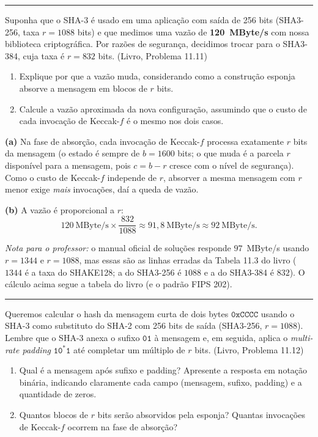 \documentclass[11pt,a4paper]{article}
\newcommand{\livro}[1]{{\footnotesize\color{black!50}(Livro, Problema #1)}}
\newcommand{\exercicio}[1]{%
    \Needspace{8\baselineskip}%
    \par\vspace{1.2em}
    \noindent
    {\color{black!55}\rule[-0.25em]{3pt}{1.6em}}%
    \hspace{0.6em}{\Large\bfseries Exerc\'{i}cio #1}
    \par\vspace{-0.4em}
    \noindent{\color{black!35}\rule{\textwidth}{0.4pt}}
    \par\vspace{0.35em}
}
\newenvironment{resposta}{%
    \begin{respostabox}
    \color{red!70!black}\sloppy
}{%
    \end{respostabox}
}
\begin{document}
\exercicio{6}
Suponha que o SHA-3 \'{e} usado em uma aplica\c{c}\~{a}o com sa\'{i}da de 256 bits (SHA3-256, taxa $r = 1088$ bits) e que medimos uma vaz\~{a}o de \textbf{120~MByte/s} com nossa biblioteca criptogr\'{a}fica. Por raz\~{o}es de seguran\c{c}a, decidimos trocar para o SHA3-384, cuja taxa \'{e} $r = 832$ bits. \livro{11.11}
\begin{enumerate}[label=(\alph*)]
    \item Explique por que a vaz\~{a}o muda, considerando como a constru\c{c}\~{a}o esponja absorve a mensagem em blocos de $r$ bits.
    \item Calcule a vaz\~{a}o aproximada da nova configura\c{c}\~{a}o, assumindo que o custo de cada invoca\c{c}\~{a}o de Keccak-$f$ \'{e} o mesmo nos dois casos.
\end{enumerate}

\begin{resposta}
\textbf{(a)} Na fase de absor\c{c}\~{a}o, cada invoca\c{c}\~{a}o de Keccak-$f$ processa exatamente $r$ bits da mensagem (o estado \'{e} sempre de $b = 1600$ bits; o que muda \'{e} a parcela $r$ dispon\'{i}vel para a mensagem, pois $c = b - r$ cresce com o n\'{i}vel de seguran\c{c}a). Como o custo de Keccak-$f$ independe de $r$, absorver a mesma mensagem com $r$ menor exige \emph{mais} invoca\c{c}\~{o}es, da\'{i} a queda de vaz\~{a}o.

\textbf{(b)} A vaz\~{a}o \'{e} proporcional a $r$:
\[
    120 \ \text{MByte/s} \times \frac{832}{1088} \approx 91{,}8 \ \text{MByte/s} \approx 92 \ \text{MByte/s}.
\]

\textit{Nota para o professor:} o manual oficial de solu\c{c}\~{o}es responde $97$~MByte/s usando $r = 1344$ e $r = 1088$, mas essas s\~{a}o as linhas erradas da Tabela 11.3 do livro ($1344$ \'{e} a taxa do SHAKE128; a do SHA3-256 \'{e} $1088$ e a do SHA3-384 \'{e} $832$). O c\'{a}lculo acima segue a tabela do livro (e o padr\~{a}o FIPS 202).
\end{resposta}

\exercicio{7}
Queremos calcular o hash da mensagem curta de dois bytes $\texttt{0xCCCC}$ usando o SHA-3 como substituto do SHA-2 com 256 bits de sa\'{i}da (SHA3-256, $r = 1088$). Lembre que o SHA-3 anexa o sufixo $\texttt{01}$ \`{a} mensagem e, em seguida, aplica o \textit{multi-rate padding} $\texttt{10}^{*}\texttt{1}$ at\'{e} completar um m\'{u}ltiplo de $r$ bits. \livro{11.12}
\begin{enumerate}[label=(\alph*)]
    \item Qual \'{e} a mensagem ap\'{o}s sufixo e padding? Apresente a resposta em nota\c{c}\~{a}o bin\'{a}ria, indicando claramente cada campo (mensagem, sufixo, padding) e a quantidade de zeros.
    \item Quantos blocos de $r$ bits ser\~{a}o absorvidos pela esponja? Quantas invoca\c{c}\~{o}es de Keccak-$f$ ocorrem na fase de absor\c{c}\~{a}o?
\end{enumerate}
\end{document}
